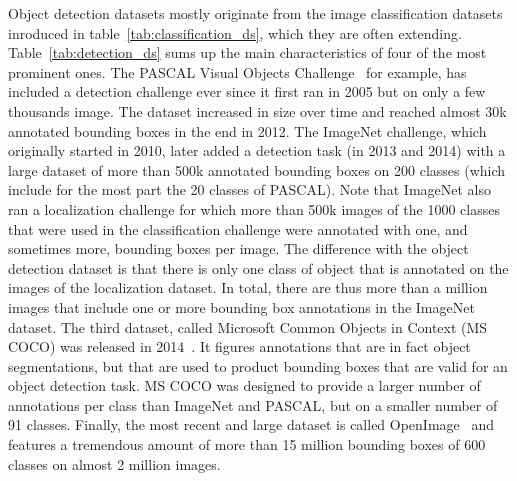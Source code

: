 Object detection datasets mostly originate from the image classification datasets
inroduced in table~\ref{tab:classification_ds}, which they are often extending.
Table~\ref{tab:detection_ds} sums up the main characteristics
of four of the most prominent ones.
The PASCAL Visual Objects Challenge~\cite{Everingham10} for example,
has included a detection challenge ever
since it first ran in 2005 but on only a few thousands image.
The dataset increased in size over time and reached
almost 30k annotated bounding boxes in the end in 2012.
The ImageNet challenge, which originally started in 2010,
later added a detection task (in 2013 and 2014)
with a large dataset of more than 500k annotated bounding boxes
on 200 classes (which include for the most part the 20 classes of PASCAL).
Note that ImageNet also ran a localization challenge for which
more than 500k images of the 1000 classes that were used in
the classification challenge were annotated with one,
and sometimes more, bounding boxes per image.
The difference with the object detection dataset is that
there is only one class of object that is annotated
on the images of the localization dataset.
In total, there are thus more than a million images
that include one or more bounding box annotations in the ImageNet dataset.
The third dataset, called Microsoft Common Objects in Context (MS COCO)
was released in 2014~\cite{lin2014microsoft}.
It figures annotations that are in fact object segmentations,
but that are used to product bounding boxes that are valid for an object detection task.
MS COCO was designed to provide a larger number of annotations
per class than ImageNet and PASCAL, but on a smaller number of 91 classes.
Finally, the most recent and large dataset is called
OpenImage~\cite{OpenImages, OpenImages2} and features a tremendous amount
of more than 15 million bounding boxes of 600 classes on almost 2 million images.

